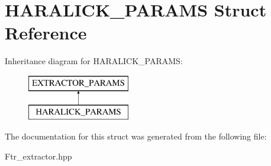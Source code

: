 \hypertarget{struct_h_a_r_a_l_i_c_k___p_a_r_a_m_s}{\section{H\+A\+R\+A\+L\+I\+C\+K\+\_\+\+P\+A\+R\+A\+M\+S Struct Reference}
\label{struct_h_a_r_a_l_i_c_k___p_a_r_a_m_s}
}
Inheritance diagram for H\+A\+R\+A\+L\+I\+C\+K\+\_\+\+P\+A\+R\+A\+M\+S\+:\begin{figure}[H]
\begin{center}
\leavevmode
\includegraphics[height=2.000000cm]{struct_h_a_r_a_l_i_c_k___p_a_r_a_m_s}
\end{center}
\end{figure}


The documentation for this struct was generated from the following file\+:\begin{DoxyCompactItemize}
\item 
Ftr\+\_\+extractor.\+hpp\end{DoxyCompactItemize}

